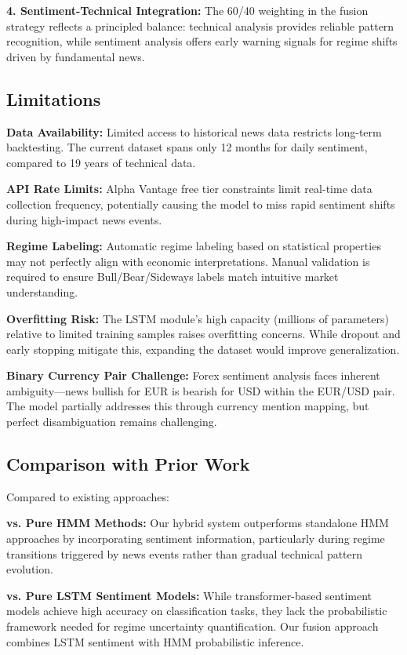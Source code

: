 \documentclass[conference]{IEEEtran}
\begin{document}
\textbf{4. Sentiment-Technical Integration:} The 60/40 weighting in the fusion strategy reflects a principled balance: technical analysis provides reliable pattern recognition, while sentiment analysis offers early warning signals for regime shifts driven by fundamental news.

\subsection{Limitations}

\textbf{Data Availability:} Limited access to historical news data restricts long-term backtesting. The current dataset spans only 12 months for daily sentiment, compared to 19 years of technical data.

\textbf{API Rate Limits:} Alpha Vantage free tier constraints limit real-time data collection frequency, potentially causing the model to miss rapid sentiment shifts during high-impact news events.

\textbf{Regime Labeling:} Automatic regime labeling based on statistical properties may not perfectly align with economic interpretations. Manual validation is required to ensure Bull/Bear/Sideways labels match intuitive market understanding.

\textbf{Overfitting Risk:} The LSTM module's high capacity (millions of parameters) relative to limited training samples raises overfitting concerns. While dropout and early stopping mitigate this, expanding the dataset would improve generalization.

\textbf{Binary Currency Pair Challenge:} Forex sentiment analysis faces inherent ambiguity—news bullish for EUR is bearish for USD within the EUR/USD pair. The model partially addresses this through currency mention mapping, but perfect disambiguation remains challenging.

\subsection{Comparison with Prior Work}

Compared to existing approaches:

\textbf{vs. Pure HMM Methods:} Our hybrid system outperforms standalone HMM approaches \cite{hassan2005} by incorporating sentiment information, particularly during regime transitions triggered by news events rather than gradual technical pattern evolution.

\textbf{vs. Pure LSTM Sentiment Models:} While transformer-based sentiment models \cite{araci2019} achieve high accuracy on classification tasks, they lack the probabilistic framework needed for regime uncertainty quantification. Our fusion approach combines LSTM sentiment with HMM probabilistic inference.
\end{document}
